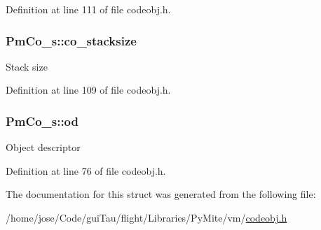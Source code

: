 Definition at line 111 of file codeobj.\-h.

\hypertarget{struct_pm_co__s_a0103d66e7361b4400770442e391c2ef8}{
\subsubsection[{co\-\_\-stacksize}]{ Pm\-Co\-\_\-s\-::co\-\_\-stacksize}}\label{struct_pm_co__s_a0103d66e7361b4400770442e391c2ef8}
Stack size 

Definition at line 109 of file codeobj.\-h.

\hypertarget{struct_pm_co__s_a352492adcc3feda753fb699d0e480726}{
\subsubsection[{od}]{ Pm\-Co\-\_\-s\-::od}}\label{struct_pm_co__s_a352492adcc3feda753fb699d0e480726}
Object descriptor 

Definition at line 76 of file codeobj.\-h.



The documentation for this struct was generated from the following file\-:\begin{DoxyCompactItemize}
\item 
/home/jose/\-Code/gui\-Tau/flight/\-Libraries/\-Py\-Mite/vm/\hyperlink{codeobj_8h}{codeobj.\-h}\end{DoxyCompactItemize}

